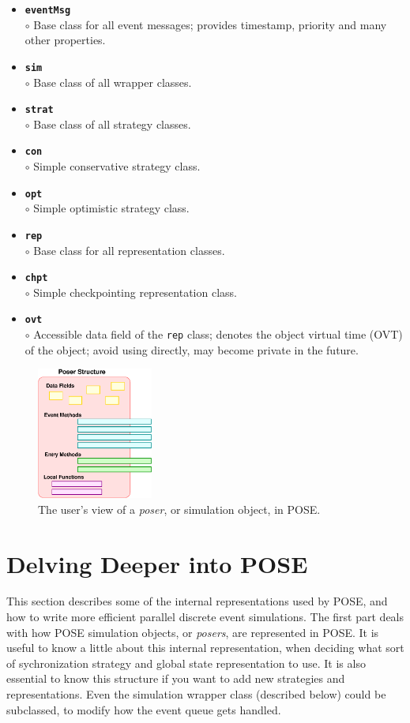\documentclass[10pt]{article}
\begin{document}
\begin{itemize}
\item {\tt {\bf eventMsg}}\\
	$\circ$ Base class for all event messages; provides timestamp,
	priority and many other properties.
\item {\tt {\bf sim}}\\
	$\circ$ Base class of all wrapper classes.
\item {\tt {\bf strat}}\\
	$\circ$ Base class of all strategy classes.
\item {\tt {\bf con}}\\
	$\circ$ Simple conservative strategy class.
\item {\tt {\bf opt}}\\
	$\circ$ Simple optimistic strategy class.
\item {\tt {\bf rep}}\\
	$\circ$ Base class for all representation classes.
\item {\tt {\bf chpt}}\\
	$\circ$ Simple checkpointing representation class.
\item {\tt {\bf ovt}}\\
	$\circ$ Accessible data field of the {\tt rep} class; denotes
	the object virtual time (OVT) of the object; avoid using
	directly, may become private in the future.
\end{itemize}


\begin{figure}[h]
\begin{center}
\includegraphics[width=1.5in]{base_struct}
\end{center}
\caption{The user's view of a {\it poser}, or simulation object, in POSE.}
\label{fig:base_struct}
\end{figure}

\section{Delving Deeper into POSE}

This section describes some of the internal representations used by
POSE, and how to write more efficient parallel discrete event
simulations.  The first part deals with how POSE simulation objects, or
{\it posers}, are represented in POSE.  It is useful to know a little
about this internal representation, when deciding what sort of
sychronization strategy and global state representation to use.  It is
also essential to know this structure if you want to add new
strategies and representations.  Even the simulation wrapper class
(described below) could be subclassed, to modify how the event queue
gets handled. 
\end{document}
